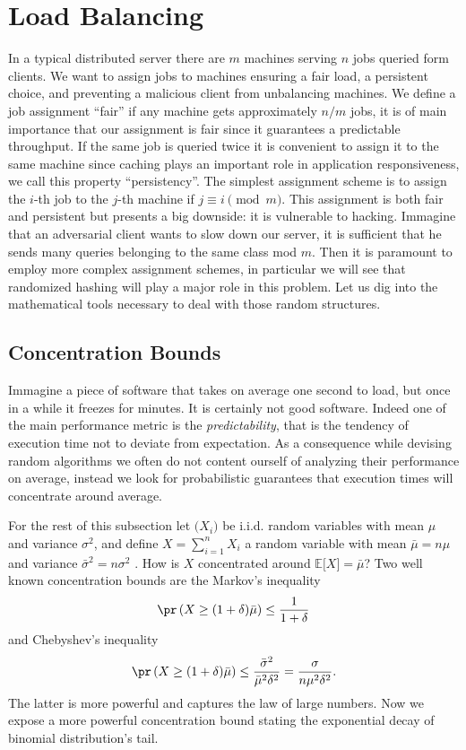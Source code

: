 \section{Load Balancing}

In a typical distributed server there are $m$ machines serving $n$ jobs
queried form clients. We want to assign jobs
to machines ensuring a fair load, a persistent choice, and preventing a
malicious client from unbalancing machines.
We define a job assignment ``fair'' if any machine gets approximately
$n / m$ jobs, it is of main importance that our assignment is fair since
it guarantees a predictable throughput.
If the same job is queried twice it is convenient to assign
it to the same machine since caching plays an important role in application
responsiveness, we call this property ``persistency''.  
The simplest assignment scheme is to assign the $i$-th job to the
$j$-th machine if $j \equiv i \pmod m$. This assignment is both fair and
persistent but presents a big downside: it is vulnerable to hacking. Immagine
that an adversarial client wants to slow down our server, it is sufficient
that he sends many queries belonging to the same class mod $m$. Then it is
paramount to employ more complex assignment schemes, in particular we will see
that randomized hashing will play a major role in this problem. Let us dig into
the mathematical tools necessary to deal with those random structures.

\subsection{Concentration Bounds}
Immagine a piece of
software that takes on average one second to load, but once in a while it
freezes for minutes. It is certainly not good software. Indeed one of the main
performance metric is the \textit{predictability}, that is the tendency
of execution
time not to deviate from expectation. As a consequence while devising
random algorithms we often do not content ourself of analyzing their
performance on average, instead we look for probabilistic guarantees
that execution times will concentrate around average.

For the rest of this subsection let $\bigl(X_i\bigr)$ be i.i.d. random
variables with mean $\mu$ and variance $\sigma^2$, and define $X = \sum_{i=1}^n X_i$ a random variable with mean $\bar{\mu} = n\mu$ and variance $\bar{\sigma}^2 = n\sigma^2$ . How is $X$ concentrated around $\mathbb{E}\bigl[X\bigr] = \bar{\mu}$?
Two well known concentration bounds are the Markov's inequality
\begin{equation*}
\pr\left(X \geq (1 + \delta)\bar{\mu}\right) \leq \frac{1}{1 + \delta}
\end{equation*}
and Chebyshev's inequality
\begin{equation*}
\pr\left(X \geq (1 + \delta)\bar{\mu}\right) \leq \frac{\bar{\sigma}^2}{ \bar{\mu}^2\delta^2} = \frac{\sigma}{n\mu^2\delta^2}.
\end{equation*}
The latter is more powerful and captures the law of large numbers. Now we expose
a more powerful concentration bound stating the exponential decay
of binomial distribution's tail.

